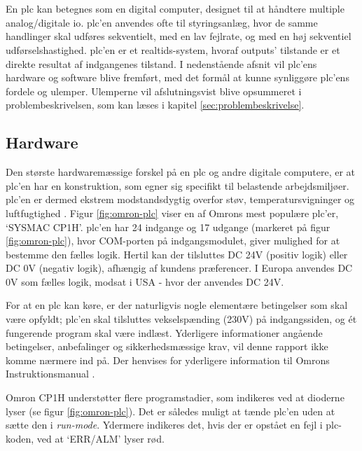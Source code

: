 \section{}
En \gls{plc} kan betegnes som en digital computer, designet til at håndtere multiple analog/digitale \gls{io}. \gls{plc}'en anvendes ofte til styringsanlæg, hvor de samme handlinger skal udføres sekventielt, med en lav fejlrate, og med en høj sekventiel udførselshastighed. \gls{plc}'en er et realtids-system, hvoraf outputs' tilstande er et direkte resultat af indgangenes tilstand. I nedenstående afsnit vil \gls{plc}'ens hardware og software blive fremført, med det formål at kunne synliggøre \gls{plc}'ens fordele og ulemper. Ulemperne vil afslutningsvist blive opsummeret i problembeskrivelsen, som kan læses i kapitel \ref{sec:problembeskrivelse}. 

\subsection{Hardware}
\label{subsec:pa-hardware}
Den største hardwaremæssige forskel på en \gls{plc} og andre digitale computere, er at \gls{plc}'en har en konstruktion, som egner sig specifikt til belastende arbejdsmiljøer. \gls{plc}'en er dermed ekstrem modstandsdygtig overfor støv, temperatursvigninger og luftfugtighed \cite{PLC_hardware_desc}. 
Figur \ref{fig:omron-plc} viser en af Omrons mest populære \gls{plc}'er, \enquote*{SYSMAC CP1H}. \gls{plc}'en har 24 indgange og 17 udgange (markeret på figur \ref{fig:omron-plc}), hvor COM-porten på indgangsmodulet, giver mulighed for at bestemme den fælles logik. Hertil kan der tilsluttes DC 24V (positiv logik) eller DC 0V (negativ logik), afhængig af kundens præferencer. I Europa anvendes DC 0V som fælles logik, modsat i USA - hvor der anvendes DC 24V. 

For at en \gls{plc} kan køre, er der naturligvis nogle elementære betingelser som skal være opfyldt; \gls{plc}'en skal tilsluttes vekselspænding (230V) på indgangssiden, og ét fungerende program skal være indlæst. Yderligere informationer angående betingelser, anbefalinger og sikkerhedsmæssige krav, vil denne rapport ikke komme nærmere ind på. Der henvises for yderligere information til Omrons Instruktionsmanual \cite{basic_knowledge_plc}.

Omron CP1H understøtter flere programstadier, som indikeres ved at dioderne lyser (se figur \ref{fig:omron-plc}). Det er således muligt at tænde \gls{plc}'en uden at sætte den i \textit{run-mode}. Ydermere indikeres det, hvis der er opstået en fejl i \gls{plc}-koden, ved at \enquote*{ERR/ALM} lyser rød. 


